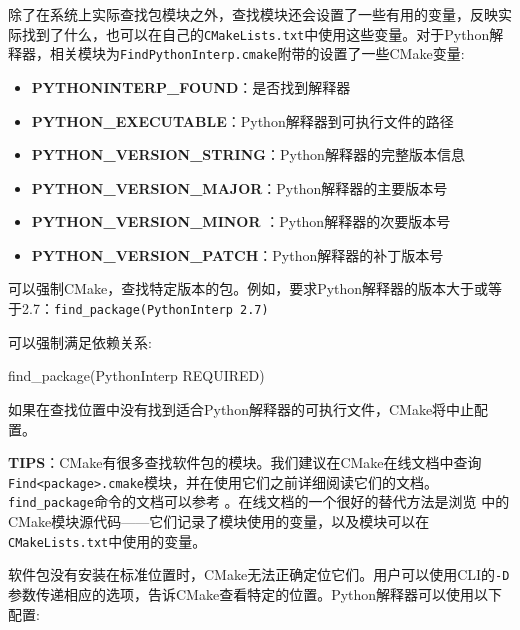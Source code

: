 除了在系统上实际查找包模块之外，查找模块还会设置了一些有用的变量，反映实际找到了什么，也可以在自己的\texttt{CMakeLists.txt}中使用这些变量。对于Python解释器，相关模块为\texttt{FindPythonInterp.cmake}附带的设置了一些CMake变量:

\begin{itemize}
\item \textbf{PYTHONINTERP\_FOUND}：是否找到解释器

\item \textbf{PYTHON\_EXECUTABLE}：Python解释器到可执行文件的路径

\item \textbf{PYTHON\_VERSION\_STRING}：Python解释器的完整版本信息

\item \textbf{PYTHON\_VERSION\_MAJOR}：Python解释器的主要版本号

\item \textbf{PYTHON\_VERSION\_MINOR} ：Python解释器的次要版本号

\item \textbf{PYTHON\_VERSION\_PATCH}：Python解释器的补丁版本号

\end{itemize}

可以强制CMake，查找特定版本的包。例如，要求Python解释器的版本大于或等于2.7：\texttt{find\_package(PythonInterp 2.7)}

可以强制满足依赖关系:

\begin{codebox}[cmake]
find_package(PythonInterp REQUIRED)
\end{codebox}

如果在查找位置中没有找到适合Python解释器的可执行文件，CMake将中止配置。

\begin{myInfoBox}
\textbf{TIPS}：CMake有很多查找软件包的模块。我们建议在CMake在线文档中查询\texttt{Find<package>.cmake}模块，并在使用它们之前详细阅读它们的文档。\texttt{find\_package}命令的文档可以参考  。在线文档的一个很好的替代方法是浏览  中的CMake模块源代码——它们记录了模块使用的变量，以及模块可以在\texttt{CMakeLists.txt}中使用的变量。
\end{myInfoBox}


软件包没有安装在标准位置时，CMake无法正确定位它们。用户可以使用CLI的\texttt{-D}参数传递相应的选项，告诉CMake查看特定的位置。Python解释器可以使用以下配置:

